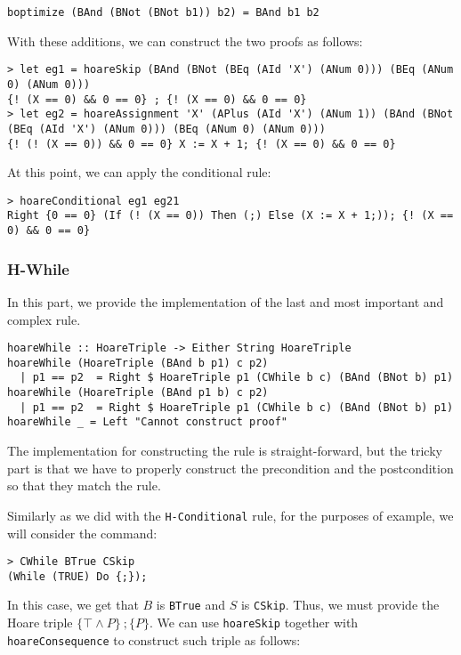 \documentclass{article}
\begin{document}
\begin{lstlisting}
boptimize (BAnd (BNot (BNot b1)) b2) = BAnd b1 b2
\end{lstlisting}

With these additions, we can construct the two proofs as follows:

\begin{lstlisting}
> let eg1 = hoareSkip (BAnd (BNot (BEq (AId 'X') (ANum 0))) (BEq (ANum 0) (ANum 0)))
{! (X == 0) && 0 == 0} ; {! (X == 0) && 0 == 0}
> let eg2 = hoareAssignment 'X' (APlus (AId 'X') (ANum 1)) (BAnd (BNot (BEq (AId 'X') (ANum 0))) (BEq (ANum 0) (ANum 0)))
{! (! (X == 0)) && 0 == 0} X := X + 1; {! (X == 0) && 0 == 0}
\end{lstlisting}

At this point, we can apply the conditional rule:

\begin{lstlisting}
> hoareConditional eg1 eg21
Right {0 == 0} (If (! (X == 0)) Then (;) Else (X := X + 1;)); {! (X == 0) && 0 == 0}
\end{lstlisting}

\subsubsection{H-While}

In this part, we provide the implementation of the last and most important and complex rule.

\begin{lstlisting}
hoareWhile :: HoareTriple -> Either String HoareTriple
hoareWhile (HoareTriple (BAnd b p1) c p2)
  | p1 == p2  = Right $ HoareTriple p1 (CWhile b c) (BAnd (BNot b) p1)
hoareWhile (HoareTriple (BAnd p1 b) c p2)
  | p1 == p2  = Right $ HoareTriple p1 (CWhile b c) (BAnd (BNot b) p1)
hoareWhile _ = Left "Cannot construct proof"
\end{lstlisting}

The implementation for constructing the rule is straight-forward, but the tricky part is that we have to properly construct the precondition and the postcondition so that they match the rule.

Similarly as we did with the \texttt{H-Conditional} rule, for the purposes of example, we will consider the command:

\begin{lstlisting}
> CWhile BTrue CSkip
(While (TRUE) Do {;});
\end{lstlisting}

In this case, we get that $B$ is \texttt{BTrue} and $S$ is \texttt{CSkip}. Thus, we must provide the Hoare triple $\{\top \land P \} \ ; \{P\}$. We can use \texttt{hoareSkip} together with \texttt{hoareConsequence} to construct such triple as follows:
\end{document}
